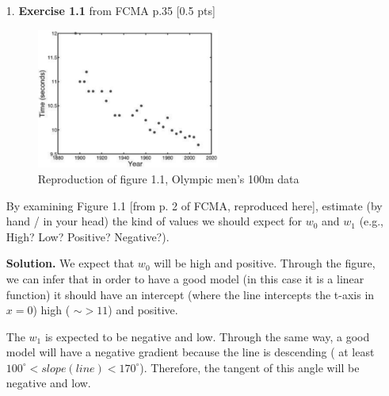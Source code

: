 \documentclass[10pt]{article}
\begin{document}
\begin{enumerate}

\item[1.]
{\bf Exercise 1.1} from FCMA p.35 [0.5 pts]

\begin{figure}[htb]
\begin{center}
\includegraphics[width=6cm]{figs/figure1-1_p2.png}
\caption{Reproduction of figure 1.1, Olympic men's 100m data}
\end{center}
\end{figure}
By examining Figure 1.1 [from p. 2 of FCMA, reproduced here], estimate (by hand / in your head) the kind of values we should expect for $w_0$ and $w_1$ (e.g., High? Low?  Positive?  Negative?).

{\bf Solution.} We expect that $w_0$ will be high and positive. Through the figure, we can infer that in order to have a good model (in this case it is a linear function) it should have an intercept (where the line intercepts the t-axis in $x = 0$) high ( $\sim > 11$) and positive. 

The $w_1$ is expected to be negative and low. Through the same way, a good model will have a negative gradient because the line is descending ( at least $100^{\circ} < slope(line) < 170^{\circ}$). Therefore, the tangent of this angle will be negative and low.




\end{enumerate}
\end{document}
